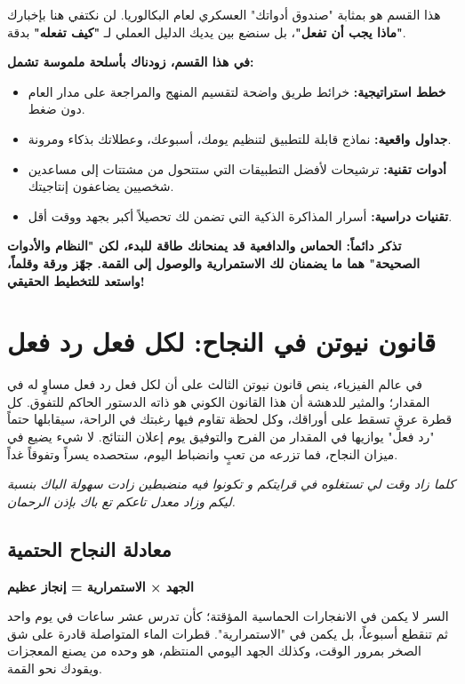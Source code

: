 \documentclass[12pt,a4paper]{book}
\newcommand{\quoteAr}[1]{%
	\begin{myquote}
		\itshape #1
	\end{myquote}
}
\newcommand{\importantAr}[1]{%
	\begin{important}
		\bfseries #1
	\end{important}
}
\begin{document}
	هذا القسم هو بمثابة "صندوق أدواتك" العسكري لعام البكالوريا. لن نكتفي هنا بإخبارك \textbf{"ماذا يجب أن تفعل"}، بل سنضع بين يديك الدليل العملي لـ \textbf{"كيف تفعله"} بدقة. 
	
	\textbf{في هذا القسم، زودناك بأسلحة ملموسة تشمل:}
	\begin{itemize}
		\item \textbf{خطط استراتيجية:} خرائط طريق واضحة لتقسيم المنهج والمراجعة على مدار العام دون ضغط.
		\item \textbf{جداول واقعية:} نماذج قابلة للتطبيق لتنظيم يومك، أسبوعك، وعطلاتك بذكاء ومرونة.
		\item \textbf{أدوات تقنية:} ترشيحات لأفضل التطبيقات التي ستتحول من مشتتات إلى مساعدين شخصيين يضاعفون إنتاجيتك.
		\item \textbf{تقنيات دراسية:} أسرار المذاكرة الذكية التي تضمن لك تحصيلاً أكبر بجهد ووقت أقل.
	\end{itemize}
	
	\importantAr{تذكر دائماً: \newline الحماس والدافعية قد يمنحانك طاقة للبدء، لكن "النظام والأدوات الصحيحة" هما ما يضمنان لك الاستمرارية والوصول إلى القمة. جهّز ورقة وقلماً، واستعد للتخطيط الحقيقي!}
	
	\section{قانون نيوتن في النجاح: لكل فعل رد فعل}
	
	في عالم الفيزياء، ينص قانون نيوتن الثالث على أن لكل فعل رد فعل مساوٍ له في المقدار؛ والمثير للدهشة أن هذا القانون الكوني هو ذاته الدستور الحاكم للتفوق. كل قطرة عرقٍ تسقط على أوراقك، وكل لحظة تقاوم فيها رغبتك في الراحة، سيقابلها حتماً "رد فعل" يوازيها في المقدار من الفرح والتوفيق يوم إعلان النتائج. لا شيء يضيع في ميزان النجاح، فما تزرعه من تعبٍ وانضباط اليوم، ستحصده يسراً وتفوقاً غداً.
	
	\quoteAr{كلما زاد وقت لي تستغلوه في قرايتكم و تكونوا فيه منضبطين زادت سهولة الباك بنسبة ليكم وزاد معدل تاعكم تع باك بإذن الرحمان.}
	
	\subsection*{معادلة النجاح الحتمية}
	\begin{center}
		\Large
		\textbf{الجهد × الاستمرارية = إنجاز عظيم}
	\end{center}
	
	السر لا يكمن في الانفجارات الحماسية المؤقتة؛ كأن تدرس عشر ساعات في يوم واحد ثم تنقطع أسبوعاً، بل يكمن في "الاستمرارية". قطرات الماء المتواصلة قادرة على شق الصخر بمرور الوقت، وكذلك الجهد اليومي المنتظم، هو وحده من يصنع المعجزات ويقودك نحو القمة.
\end{document}
